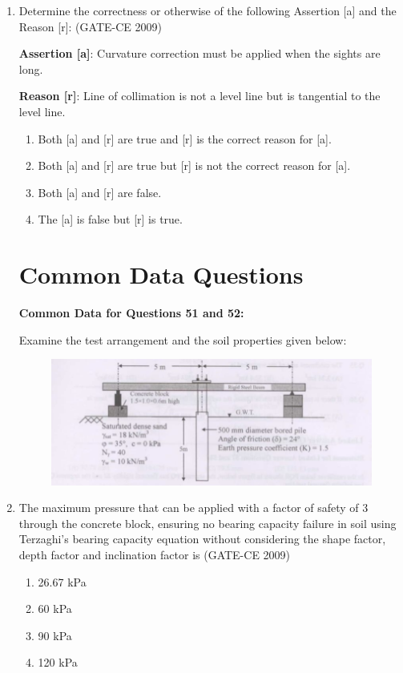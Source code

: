 \documentclass[journal,12pt,onecolumn]{article}
\theoremstyle{remark}
\begin{document}
\begin{enumerate}
    \item Determine the correctness or otherwise of the following Assertion [a] and the Reason [r]: (GATE-CE 2009)

    \textbf{Assertion [a]}: Curvature correction must be applied when the sights are long.

    \textbf{Reason [r]}: Line of collimation is not a level line but is tangential to the level line.
    \begin{enumerate}
        \item Both [a] and [r] are true and [r] is the correct reason for [a].
        \item Both [a] and [r] are true but [r] is not the correct reason for [a].
        \item Both [a] and [r] are false.
        \item The [a] is false but [r] is true.
    \end{enumerate}

\section*{Common Data Questions}
\textbf{Common Data for Questions 51 and 52:}

Examine the test arrangement and the soil properties given below:
\begin{figure}[H]
    \centering
    \includegraphics[width=0.7\columnwidth]{figs/image5.jpg}
    \caption{}
    \label{fig:placeholder}
    \end{figure}

    \item The maximum pressure that can be applied with a factor of safety of 3 through the concrete block, ensuring no bearing capacity failure in soil using Terzaghi's bearing capacity equation without considering the shape factor, depth factor and inclination factor is (GATE-CE 2009)
    \begin{multicols}{2}
    \begin{enumerate}
        \item 26.67 kPa 
        \item 60 kPa 
        \item 90 kPa 
        \item 120 kPa
    \end{enumerate}
\end{multicols}
    

\end{enumerate}
\end{document}

